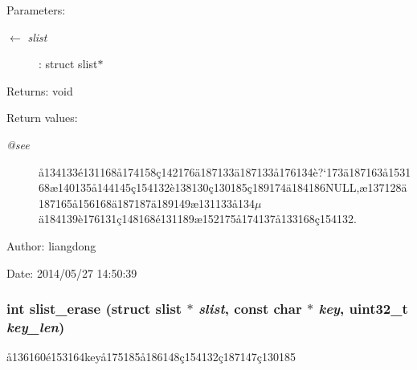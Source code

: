 \begin{Desc}
\item[Parameters:]
\begin{description}
\item[\mbox{$\leftarrow$} {\em slist}]: struct slist$\ast$ \end{description}
\end{Desc}
\begin{Desc}
\item[Returns:]void \end{Desc}
\begin{Desc}
\item[Return values:]
\begin{description}
\item[{\em @see}]\aa{}134133\'{e}131168\aa{}174158\c{c}142176\"{a}187133\"{a}187133\aa{}176134\`{e}?`173\"{a}187163\aa{}153168\ae{}140135\aa{}144145\c{c}154132\`{e}138130\c{c}130185\c{c}189174\"{a}184186NULL,\ae{}137128\"{a}187165\aa{}156168\"{a}187187\"{a}189149\ae{}131133\aa{}134$\mu$\"{a}184139\`{e}176131\c{c}148168\'{e}131189\ae{}152175\aa{}174137\aa{}133168\c{c}154132. \end{description}
\end{Desc}
\begin{Desc}
\item[Author:]liangdong \end{Desc}
\begin{Desc}
\item[Date:]2014/05/27 14:50:39 \end{Desc}
\subsubsection{\setlength{\rightskip}{0pt plus 5cm}int slist\_\-erase (struct slist $\ast$ {\em slist}, const char $\ast$ {\em key}, uint32\_\-t {\em key\_\-len})}\label{slist_8c_a10}


\aa{}136160\'{e}153164key\aa{}175185\aa{}186148\c{c}154132\c{c}187147\c{c}130185 

